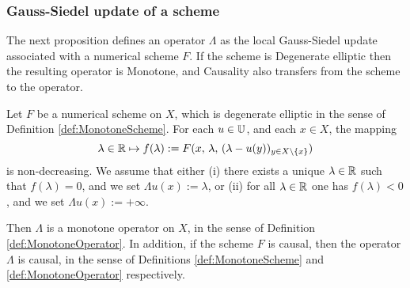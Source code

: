 


\subsubsection{Gauss-Siedel update of a scheme}

The next proposition defines an operator $\Lambda$ as the local Gauss-Siedel update associated with a numerical scheme $F$. If the scheme is Degenerate elliptic then the resulting operator is Monotone, and Causality also transfers from the scheme to the operator. %

\begin{proposition}
\label{prop:GaussSiedelCausal}
	Let $F$ be a numerical scheme on $X$, which is degenerate elliptic in the sense of Definition \ref{def:MonotoneScheme}.
	For each $u \in \mathbb{U}$, and each $x \in X$, the mapping 
	\begin{equation}
	\label{eqdef:fLambda}
		\lambda \in \mathbb{R} \mapsto  f(\lambda) := F(x,\, \lambda,\, (\lambda-u(y))_{y\in X \setminus\{x\}})
	\end{equation}
	is non-decreasing. 
	We assume that either (i) there exists a unique $\lambda \in \mathbb{R}$ such that $f(\lambda)=0$, and we set $\Lambda u(x) := \lambda$, or (ii) for all $\lambda \in \mathbb{R}$ one has $f(\lambda) < 0$, and we set $\Lambda u(x) := +\infty$.
	
	Then $\Lambda$ is a monotone operator on $X$, in the sense of Definition \ref{def:MonotoneOperator}.
	In addition, if the scheme $F$ is causal, then the operator $\Lambda$ is causal, in the sense of Definitions \ref{def:MonotoneScheme} and \ref{def:MonotoneOperator} respectively.	
\end{proposition}

